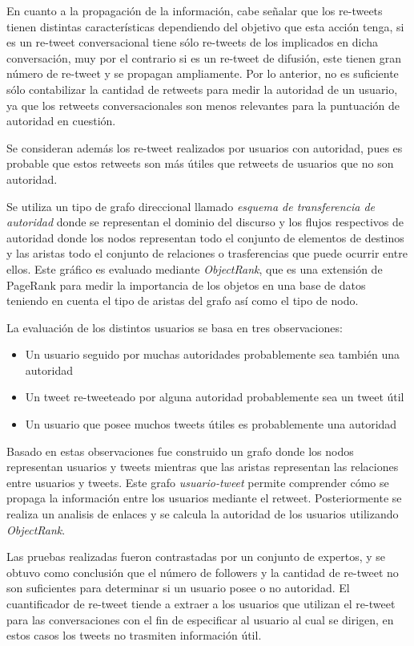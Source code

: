 En cuanto a la propagación de la información, cabe señalar que los re-tweets tienen distintas características dependiendo del objetivo que esta acción tenga, si es un re-tweet conversacional tiene sólo re-tweets de los implicados en dicha conversación, muy por el contrario si es un re-tweet de difusión, este tienen gran número de re-tweet y se propagan ampliamente. Por lo anterior, no es suficiente sólo contabilizar la cantidad de retweets para medir la autoridad de un usuario, ya que los retweets conversacionales son menos relevantes para la puntuación de autoridad en cuestión. 

Se consideran además los re-tweet realizados por usuarios con autoridad, pues es probable que estos retweets son más útiles que retweets de usuarios que no son autoridad.

Se utiliza un tipo de grafo direccional llamado \emph{esquema de transferencia de autoridad} donde se representan el dominio del discurso y los flujos respectivos de autoridad donde los nodos representan todo el conjunto de elementos de destinos y las aristas todo el conjunto de relaciones o trasferencias que puede ocurrir entre ellos. Este gráfico es evaluado mediante \emph{ObjectRank}, que es una extensión de PageRank\cite{ilprints422} para medir la importancia de los objetos en una base de datos teniendo en cuenta el tipo de aristas del grafo así como el tipo de nodo.

La evaluación de los distintos usuarios se basa en tres observaciones:

\begin{itemize}
	\item Un usuario seguido por muchas autoridades probablemente sea también una autoridad
	\item Un tweet re-tweeteado por alguna autoridad probablemente sea un tweet útil
	\item Un usuario que posee muchos tweets útiles es probablemente una autoridad
\end{itemize} 

Basado en estas observaciones fue construido un grafo donde los nodos representan usuarios y tweets mientras que las aristas representan las relaciones entre usuarios y tweets. Este grafo \emph{usuario-tweet} permite comprender cómo se propaga la información entre los usuarios mediante el retweet. Posteriormente se realiza un analisis de enlaces y se calcula la autoridad de los usuarios utilizando \emph{ObjectRank}.
 
Las pruebas realizadas fueron contrastadas por un conjunto de expertos, y se obtuvo como conclusión que el número de followers y la cantidad de re-tweet no son suficientes para determinar si un usuario posee o no autoridad. El cuantificador de re-tweet tiende a extraer a los usuarios que utilizan el re-tweet para las conversaciones con el fin de especificar al usuario al cual se dirigen, en estos casos los tweets no trasmiten información útil.

